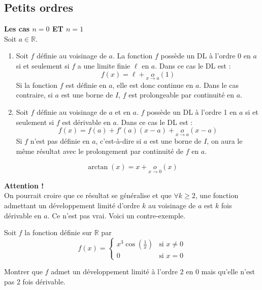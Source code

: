 \subsection{Petits ordres}
\begin{Thm}\textbf{ Les cas $n = 0$ ET $n = 1$}\\
Soit $a \in \mathbb{R}$.

\begin{enumerate}
    \item Soit $f$ définie au voisinage de $a$. La fonction $f$ possède un DL à l’ordre 0 en $a$ si et seulement si $f$ a une limite finie $\ell$ en $a$. Dans ce cas le DL est :
    \[ f(x) = \ell + \underset{x \to a}{o}(1) \]
    Si la fonction $f$ est définie en $a$, elle est donc continue en $a$. Dans le cas contraire, si $a$ est une borne de $I$, $f$ est prolongeable par continuité en $a$.

    \item Soit $f$ définie au voisinage de $a$ et en $a$. $f$ possède un DL à l’ordre 1 en $a$ si et seulement si $f$ est dérivable en $a$. Dans ce cas le DL est :
    \[ f(x) = f(a) + f'(a)(x - a) + \underset{x \to a}{o}(x - a) \]
    Si $f$ n’est pas définie en $a$, c’est-à-dire si $a$ est une borne de $I$, on aura le même résultat avec le prolongement par continuité de $f$ en $a$.\\
\end{enumerate}

\end{Thm}


\begin{Ex}
\[ \arctan(x) = x + \underset{x \to 0}{o}(x) \]


\end{Ex}




\begin{Rem}\textbf{Attention !}\\
 On pourrait croire que ce résultat se généralise et que $\forall k \geq 2$, une fonction admettant un développement limité d’ordre $k$ au voisinage de $a$ est $k$ fois dérivable en $a$. Ce n’est pas vrai. Voici un contre-exemple.\\
\end{Rem}


\begin{CEx}

Soit $f$ la fonction définie sur $\mathbb{R}$ par 
\[ 
f(x) =
\begin{cases} 
x^3 \cos\left(\frac{1}{x}\right) & \text{si } x \neq 0 \\
0 & \text{si } x = 0 
\end{cases}
\]

Montrer que $f$ admet un développement limité à l’ordre $2$ en $0$ mais qu’elle n’est pas 2 fois dérivable.\\


\end{CEx}


